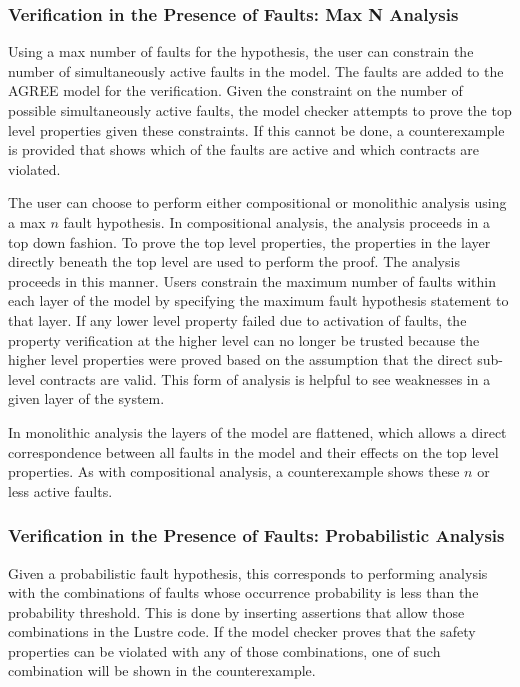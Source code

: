 \subsubsection{Verification in the Presence of Faults: Max N Analysis}
Using a max number of faults for the hypothesis, the user can constrain the number of simultaneously active faults in the model. The faults are added to the AGREE model for the verification. Given the constraint on the number of possible simultaneously active faults, the model checker attempts to prove the top level properties given these constraints. If this cannot be done, a counterexample is provided that shows which of the faults are active and which contracts are violated. 

The user can choose to perform either compositional or monolithic analysis using a max $n$ fault hypothesis. In compositional analysis, the analysis proceeds in a top down fashion. To prove the top level properties, the properties in the layer directly beneath the top level are used to perform the proof. The analysis proceeds in this manner. Users constrain the maximum number of faults within each layer of the model by specifying the maximum fault hypothesis statement to that layer. If any lower level property failed due to activation of faults, the property verification at the higher level can no longer be trusted because the higher level properties were proved based on the assumption that the direct sub-level contracts are valid. This form of analysis is helpful to see weaknesses in a given layer of the system. 

In monolithic analysis the layers of the model are flattened, which allows a direct correspondence between all faults in the model and their effects on the top level properties. As with compositional analysis, a counterexample shows these $n$ or less active faults. 


\subsubsection{Verification in the Presence of Faults: Probabilistic Analysis} 
Given a probabilistic fault hypothesis, this corresponds to performing analysis with the combinations of faults whose occurrence probability is less than the probability threshold. This is done by inserting assertions that allow those combinations in the Lustre code. If the model checker proves that the safety properties can be violated with any of those combinations, one of such combination will be shown in the counterexample. 

